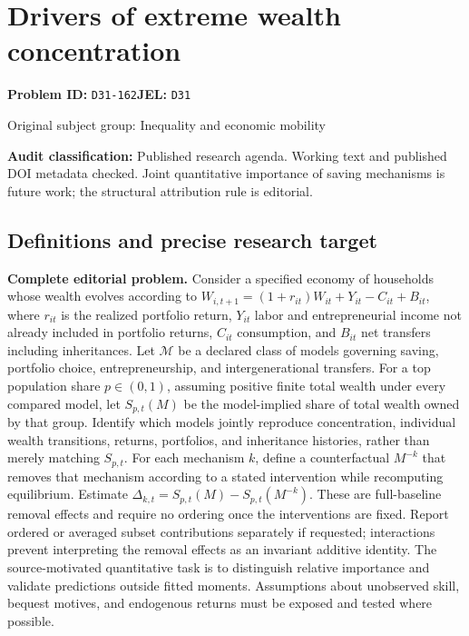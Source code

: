 \documentclass[11pt,a4paper]{article}
\begin{document}
\section*{Drivers of extreme wealth concentration}
\textbf{Problem ID:} \texttt{D31-162}\quad \textbf{JEL:} \texttt{D31}\par
\label{problem:OP-0362}
\label{audited:ECON-028}
{\sffamily\small\color{muted}Original subject group: Inequality and economic mobility\par}
\label{definitions:problem:30007644}
\textbf{Audit classification:} Published research agenda. Working text and published DOI metadata checked. Joint quantitative importance of saving mechanisms is future work; the structural attribution rule is editorial.
\subsection*{Definitions and precise research target}
\textbf{Complete editorial problem.} Consider a specified economy of households whose wealth evolves according to \(W_{i,t+1}=(1+r_{it})W_{it}+Y_{it}-C_{it}+B_{it}\), where \(r_{it}\) is the realized portfolio return, \(Y_{it}\) labor and entrepreneurial income not already included in portfolio returns, \(C_{it}\) consumption, and \(B_{it}\) net transfers including inheritances. Let \(\mathcal M\) be a declared class of models governing saving, portfolio choice, entrepreneurship, and intergenerational transfers. For a top population share \(p\in(0,1)\), assuming positive finite total wealth under every compared model, let \(S_{p,t}(M)\) be the model-implied share of total wealth owned by that group. Identify which models jointly reproduce concentration, individual wealth transitions, returns, portfolios, and inheritance histories, rather than merely matching \(S_{p,t}\). For each mechanism \(k\), define a counterfactual \(M^{-k}\) that removes that mechanism according to a stated intervention while recomputing equilibrium. Estimate \(\Delta_{k,t}=S_{p,t}(M)-S_{p,t}(M^{-k})\). These are full-baseline removal effects and require no ordering once the interventions are fixed. Report ordered or averaged subset contributions separately if requested; interactions prevent interpreting the removal effects as an invariant additive identity. The source-motivated quantitative task is to distinguish relative importance and validate predictions outside fitted moments. Assumptions about unobserved skill, bequest motives, and endogenous returns must be exposed and tested where possible.
\end{document}
